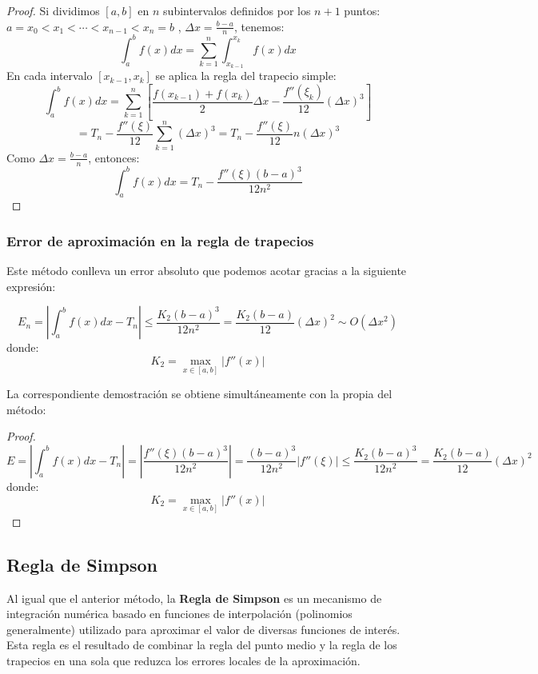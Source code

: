\documentclass[12pt]{article}
\begin{document}
\begin{proof}

Si dividimos $[a,b]$ en $n$ subintervalos definidos por los $n + 1$ puntos:
$a =x_0 <x_1 <\cdots < x_{n-1} < x_n = b$ , $\Delta x = \frac{b-a}{n}$, tenemos:
\[
\int_{a}^{b} f (x)dx = \sum_{k=1}^{n} \int_{x_{k-1}}^{x_k} f (x)dx
\]
En cada intervalo $[x_{k-1},x_k]$ se aplica la regla del trapecio simple:
\[
\int_{a}^{b} f (x)dx = \sum_{k=1}^{n} \left[\frac{f (x_{k-1}) + f (x_k)}{2}\Delta x - \frac{f''(\xi_k)}{12} (\Delta x)^3\right]
\]
\[
= T_n - \frac{f''(\xi)}{12} \sum_{k=1}^{n} (\Delta x)^3 = T_n - \frac{f''(\xi)}{12} n(\Delta x)^3
\]
Como $\Delta x = \frac{b-a}{n}$, entonces:
\[
\int_{a}^{b} f (x)dx = T_n - \frac{f''(\xi)(b -a)^3}{12n^2}
\]
\end{proof}


\subsubsection{Error de aproximación en la regla de trapecios}

Este método conlleva un error absoluto que podemos acotar gracias a la siguiente expresión:

$$
E_n = \left| \int_{a}^{b} f(x)dx  - T_n\right| \leq \frac{K_2(b-a)^3}{12n^2}= \frac{K_2(b-a)}{12}(\Delta x)^2 \sim O(\Delta x^2)
$$
donde:
$$
K_2 = \max_{x \in [a, b]} |f''(x)|
$$

La correspondiente demostración se obtiene simultáneamente con la propia del método:

\begin{proof}
\[
E = \left|\int_{a}^{b} f (x)dx -T_n\right| = \left|\frac{f''(\xi)(b -a)^3}{12n^2}\right| = \frac{(b-a)^3}{12n^2} |f''(\xi)| \leq \frac{K_2(b -a)^3}{12n^2} = \frac{K_2(b-a)}{12} (\Delta x)^2
\]
donde:
\[
K_2 = \max_{x\in[a,b]} |f''(x)| 
\]
\end{proof}


\subsection{Regla de Simpson}

Al igual que el anterior método, la \textbf{Regla de Simpson} es un mecanismo de integración numérica basado en funciones de interpolación (polinomios generalmente) utilizado para aproximar el valor de diversas funciones de interés. Esta regla es el resultado de combinar la regla del punto medio y la regla de los trapecios en una sola que reduzca los errores locales de la aproximación.\\
\end{document}
